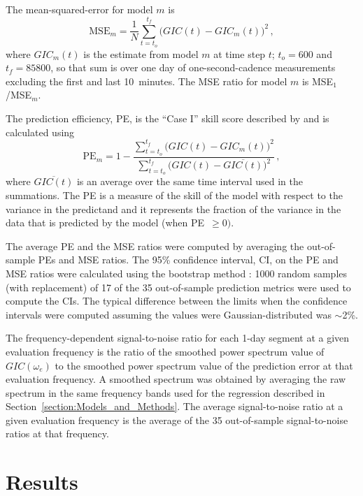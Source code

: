 \documentclass[draft,linenumbers]{agujournal2018}
\begin{document}
The mean-squared-error for model $m$ is
\begin{equation*}
  \mbox{MSE}_m = \frac{1}{N}\sum_{t=t_o}^{t_f} \big(GIC(t)-GIC_m(t)\big)^2 \,,
\end{equation*}
\noindent
where $GIC_m(t)$ is the estimate from model $m$ at time step $t$;  $t_o=600$ and $t_f=85800$, so that sum is over one day of one-second-cadence measurements excluding the first and last 10~minutes. The MSE ratio for model $m$ is MSE$_1$/MSE$_m$.

The prediction efficiency, PE, is the ``Case I'' skill score described by \cite{Murphy1988} and is calculated using
\begin{equation*}
  \mbox{PE}_m = 1 - \frac{\sum_{t=t_o}^{t_f} \big(GIC(t)-GIC_m(t)\big)^2}{\sum_{t=t_o}^{t_f} \big(GIC(t)-\overline{GIC(t)}\big)^2}\,,
\end{equation*}
\noindent
where $\overline{GIC(t)}$ is an average over the same time interval used in the summations. The PE is a measure of the skill of the model with respect to the variance in the predictand and it represents the fraction of the variance in the data that is predicted by the model (when PE~$\ge 0)$.

The average PE and the MSE ratios were computed by averaging the out-of-sample PEs and MSE ratios. The 95\% confidence interval, CI, on the PE and MSE ratios were calculated using the bootstrap method \citep{Zoubir1998}: 1000 random samples (with replacement) of 17 of the 35 out-of-sample prediction metrics were used to compute the CIs. The typical difference between the limits when the confidence intervals were computed assuming the values were Gaussian-distributed was $\sim$2\%.

The frequency-dependent signal-to-noise ratio for each 1-day segment at a given evaluation frequency is the ratio of the smoothed power spectrum value of $GIC(\omega_e)$ to the smoothed power spectrum value of the prediction error at that evaluation frequency. A smoothed spectrum was obtained by averaging the raw spectrum in the same frequency bands used for the regression described in Section~\ref{section:Models_and_Methods}. The average signal-to-noise ratio at a given evaluation frequency is the average of the 35 out-of-sample signal-to-noise ratios at that frequency.

\section{Results}
\label{results}
\end{document}
